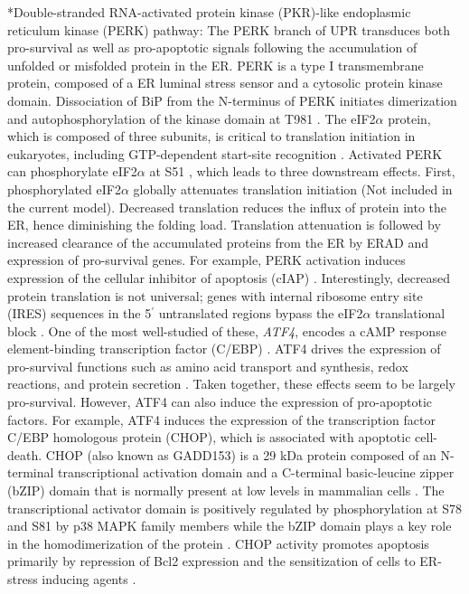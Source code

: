 \documentclass[12pt]{article}
\makeatletter
\renewcommand\subsection{\@startsection
	{subsection}{2}{0mm}
	{-0.05in}
	{-0.5\baselineskip}
	{\normalfont\normalsize\bfseries}}
\makeatother
\begin{document}
\subsection*{Double-stranded RNA-activated protein kinase (PKR)-like endoplasmic reticulum kinase (PERK) pathway:} The PERK branch of UPR transduces both pro-survival as well as pro-apoptotic signals following the accumulation of unfolded or misfolded protein in the ER. PERK is a type I transmembrane protein, composed of a ER luminal stress sensor and a cytosolic protein kinase domain. Dissociation of BiP from the N-terminus of PERK initiates dimerization and autophosphorylation of the kinase domain at T981 \citep{Kebache:2004kx}. The eIF2$\alpha$ protein, which is composed of three subunits, is critical to translation initiation in eukaryotes, including GTP-dependent start-site recognition \citep{Merrick:2004lr}. Activated PERK can phosphorylate eIF2$\alpha$ at S51 \citep{harding1999pta,Raven:2008fu}, which leads to three downstream effects. First, phosphorylated eIF2$\alpha$ globally attenuates translation initiation (Not included in the current model). Decreased translation reduces the influx of protein into the ER, hence diminishing the folding load. Translation attenuation is followed by increased clearance of the accumulated proteins from the ER by ERAD and expression of pro-survival genes. For example, PERK activation induces expression of the cellular inhibitor of apoptosis (cIAP) \citep{hamanaka2008pdr}. Interestingly, decreased protein translation is not universal; genes with internal ribosome entry site (IRES) sequences in the 5$^{\prime}$ untranslated regions bypass the eIF2$\alpha$ translational block \citep{Schroder:2005vn}. One of the most well-studied of these, \emph{ATF4}, encodes a cAMP response element-binding transcription factor (C/EBP) \citep{lu2004tra}. ATF4 drives the expression of pro-survival functions such as amino acid transport and synthesis, redox reactions, and protein secretion \citep{harding2003isr}. Taken together, these effects seem to be largely pro-survival. However, ATF4 can also induce the expression of pro-apoptotic factors. For example, ATF4 induces the expression of the transcription factor C/EBP homologous protein (CHOP), which is associated with apoptotic cell-death. CHOP (also known as GADD153) is a 29 kDa protein composed of an N-terminal transcriptional activation domain and a C-terminal basic-leucine zipper (bZIP) domain that is normally present at low levels in mammalian cells \citep{ron1992cnd}. The transcriptional activator domain is positively regulated by phosphorylation at S78 and S81 by p38 MAPK family members \citep{wang272sip,maytin2001sit} while the bZIP domain plays a key role in the homodimerization of the protein \citep{matsumoto1996eec,maytin2001sit}. CHOP activity promotes apoptosis primarily by repression of Bcl2 expression and the sensitization of cells to ER-stress inducing agents \citep{gotoh:hdc,mccullough2001gsc}. 
\end{document}
